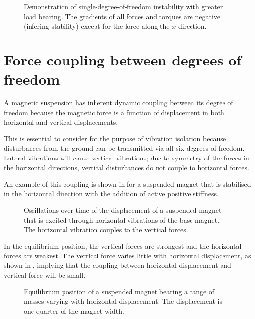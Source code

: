 \documentclass[11pt,a4paper]{memoir}
\begin{document}
\begin{figure}
  \caption{
    Demonstration of single-degree-of-freedom instability with greater load bearing.
    The gradients of all forces and torques are negative (infering stability)
    except for the force along the $x$ direction.
  }
\end{figure}


\section{Force coupling between degrees of freedom}

A magnetic suspension has inherent dynamic coupling between its degree of
freedom because the magnetic force is a function of displacement in both
horizontal and vertical displacements.

This is essential to consider for the purpose of vibration isolation because
disturbances from the ground can be transmitted via all six degrees of
freedom. Lateral vibrations will cause vertical vibrations; due to symmetry of
the forces in the horizontal directions, vertical disturbances do not couple
to horizontal forces.

An example of this coupling is shown in  for a
suspended magnet that is stabilised in the horizontal direction with the
addition of active positive stiffness. 

\begin{figure}
  \caption{Oscillations over time of the displacement of a suspended magnet that is excited through horizontal vibrations of the base magnet. The horizontal vibration couples to the vertical forces.}
\end{figure}

In the equilibrium position, the vertical forces are strongest and the
horizontal forces are weakest. The vertical force varies little with
horizontal displacement, as shown in , implying
that the coupling between horizontal displacement and vertical force will be
small.

\begin{figure}
  \caption{Equilibrium position of a suspended magnet bearing a range of
  masses varying with horizontal displacement.
  The displacement is one quarter of the magnet width.}
\end{figure}
\end{document}
